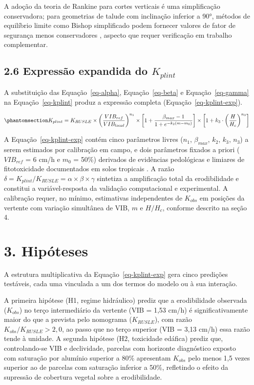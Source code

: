 \documentclass[
  brazilian,
  authoryear,
  preprint]{elsarticle}
\begin{document}
A adoção da teoria de Rankine para cortes verticais é uma simplificação
conservadora; para geometrias de talude com inclinação inferior a 90°,
métodos de equilíbrio limite como Bishop simplificado podem fornecer
valores de fator de segurança menos conservadores
\citep{fredlund_rahardjo_1993}, aspecto que requer verificação em
trabalho complementar.

\subsection{\texorpdfstring{2.6 Expressão expandida do
\(K_{plint}\)}{2.6 Expressão expandida do K\_\{plint\}}}\label{expressuxe3o-expandida-do-k_plint}

A substituição das Equação~\ref{eq-alpha}, Equação~\ref{eq-beta} e
Equação~\ref{eq-gamma} na Equação~\ref{eq-kplint} produz a expressão
completa (Equação~\ref{eq-kplint-exp}).

\begin{equation}\phantomsection\label{eq-kplint-exp}{
K_{plint} = K_{RUSLE} \times \left(\dfrac{VIB_{ref}}{VIB_{local}}\right)^{n_1} \times \left[1 + \dfrac{\beta_{max} - 1}{1 + e^{-k_2(m - m_0)}}\right] \times \left[1 + k_3 \cdot \left(\dfrac{H}{H_c}\right)^{n_3}\right]
}\end{equation}

A Equação~\ref{eq-kplint-exp} contém cinco parâmetros livres (\(n_1\),
\(\beta_{max}\), \(k_2\), \(k_3\), \(n_3\)) a serem estimados por
calibração em campo, e dois parâmetros fixados a priori (\(VIB_{ref}\) =
6 cm/h e \(m_0\) = 50\%) derivados de evidências pedológicas e limiares
de fitotoxicidade documentados em solos tropicais \citep{embrapa_2018}.
A razão
\(\delta = K_{plint}/K_{RUSLE} = \alpha \times \beta \times \gamma\)
sintetiza a amplificação total da erodibilidade e constitui a
variável-resposta da validação computacional e experimental. A
calibração requer, no mínimo, estimativas independentes de \(K_{obs}\)
em posições da vertente com variação simultânea de VIB, \(m\) e
\(H/H_c\), conforme descrito na seção 4.

\section{3. Hipóteses}\label{hipuxf3teses}

A estrutura multiplicativa da Equação~\ref{eq-kplint-exp} gera cinco
predições testáveis, cada uma vinculada a um dos termos do modelo ou à
sua interação.

A primeira hipótese (H1, regime hidráulico) prediz que a erodibilidade
observada (\(K_{obs}\)) no terço intermediário da vertente (VIB = 1,53
cm/h) é significativamente maior do que a prevista pelo nomograma
(\(K_{RUSLE}\)), com razão \(K_{obs}/K_{RUSLE} > 2{,}0\), ao passo que
no terço superior (VIB = 3,13 cm/h) essa razão tende à unidade. A
segunda hipótese (H2, toxicidade edáfica) prediz que, controlando-se VIB
e declividade, parcelas com horizonte diagnóstico exposto com saturação
por alumínio superior a 80\% apresentam \(K_{obs}\) pelo menos 1,5 vezes
superior ao de parcelas com saturação inferior a 50\%, refletindo o
efeito da supressão de cobertura vegetal sobre a erodibilidade.
\end{document}
